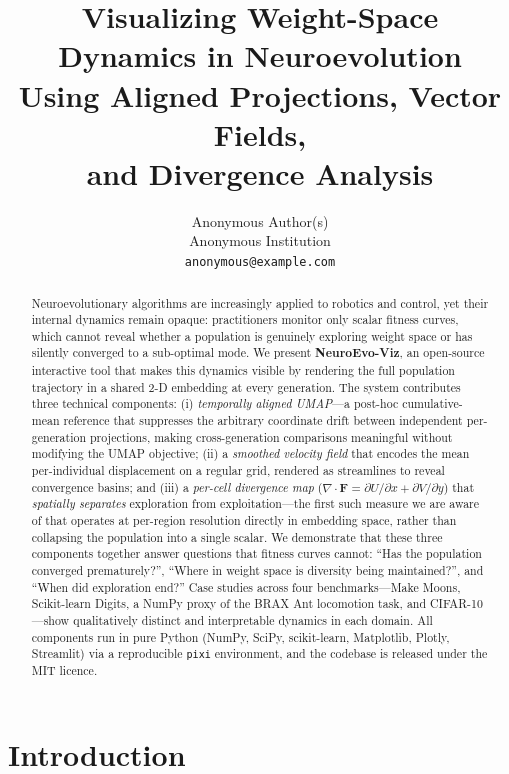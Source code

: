 \documentclass{article}
\title{Visualizing Weight-Space Dynamics in Neuroevolution\\
       Using Aligned Projections, Vector Fields,\\
       and Divergence Analysis}
\author{%
  Anonymous Author(s) \\
  Anonymous Institution \\
  \texttt{anonymous@example.com} \\
}
\begin{document}
\maketitle


\begin{abstract}
Neuroevolutionary algorithms are increasingly applied to robotics and control,
yet their internal dynamics remain opaque: practitioners monitor only scalar
fitness curves, which cannot reveal whether a population is genuinely exploring
weight space or has silently converged to a sub-optimal mode.
We present \textbf{NeuroEvo-Viz}, an open-source interactive tool that makes
this dynamics visible by rendering the full population trajectory in a shared
2-D embedding at every generation.
The system contributes three technical components:
(i) \emph{temporally aligned UMAP}---a post-hoc cumulative-mean reference that
suppresses the arbitrary coordinate drift between independent per-generation
projections, making cross-generation comparisons meaningful without modifying
the UMAP objective;
(ii) a \emph{smoothed velocity field} that encodes the mean per-individual
displacement on a regular grid, rendered as streamlines to reveal convergence
basins; and
(iii) a \emph{per-cell divergence map}
($\nabla \cdot \mathbf{F} = \partial U / \partial x + \partial V / \partial y$)
that \emph{spatially separates} exploration from exploitation---the first such
measure we are aware of that operates at per-region resolution directly in
embedding space, rather than collapsing the population into a single scalar.
We demonstrate that these three components together answer questions that fitness
curves cannot: ``Has the population converged prematurely?'',
``Where in weight space is diversity being maintained?'', and
``When did exploration end?''
Case studies across four benchmarks---Make Moons, Scikit-learn Digits, a
NumPy proxy of the BRAX Ant locomotion task, and CIFAR-10---show qualitatively
distinct and interpretable dynamics in each domain.
All components run in pure Python (NumPy, SciPy, scikit-learn, Matplotlib,
Plotly, Streamlit) via a reproducible \texttt{pixi} environment, and the
codebase is released under the MIT licence.
\end{abstract}


\section{Introduction}
\end{document}
